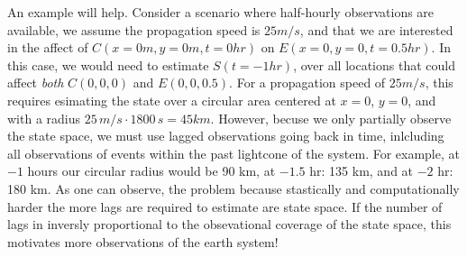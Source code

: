\documentclass[12pt]{article}
\begin{document}
An example will help. Consider a scenario where half-hourly
observations are available, we assume the propagation speed is
$25 m/s$, and that we are interested in the affect of
$C(x=0 m, y=0 m, t=0 hr)$ on $E(x=0, y=0, t=0.5 hr)$. In this case, we
would need to estimate $S(t=-1 hr)$, over all locations that could
affect \emph{both} $C(0,0,0)$ and $E(0,0,0.5)$.  For a propagation
speed of $25 m/s$, this requires esimating the state over a circular
area centered at $x=0$, $y=0$, and with a radius
$25 \, m/s \cdot 1800 \, s = 45 km$. However, becuse we only partially
observe the state space, we must use lagged observations going back in
time, inlcluding all observations of events within the past lightcone
of the system. For example, at $-1$ hours our circular radius would be
90 km, at $-1.5$ hr: 135 km, and at $-2$ hr: 180 km. As one can
observe, the problem because stastically and computationally harder
the more lags are required to estimate are state space. If the number
of lags in inversly proportional to the obsevational coverage of the
state space, this motivates more observations of the earth system!
\end{document}
